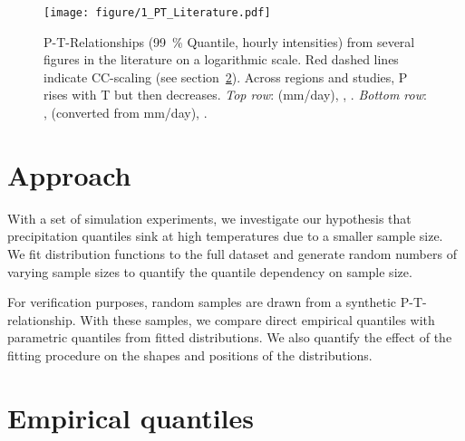 \documentclass[a4paper]{article}
\begin{document}
\begin{figure}[H] %
\texttt{[image: figure/1\_PT\_Literature.pdf]}
\caption[P-T-relationships in literature]{P-T-Relationships (99~\% Quantile, hourly intensities) from several figures in the literature  on a logarithmic scale. Red dashed lines indicate CC-scaling (see section~\ref{sec:equant}). Across regions and studies, P rises with T but then decreases.
\textit{Top row}:  \citet{berg_seasonal_2009} (mm/day), \citet{berg_strong_2013}, \citet{berg_unexpected_2013}.
\textit{Bottom row}: \citet{hardwick_jones_observed_2010}, \citet{utsumi_does_2011} (converted from mm/day), \citet{westra_future_2014}.}
\label{fig:PT_lit}
\end{figure}


\pagebreak

\section{Approach} %
\begin{multicols}{2}
With a set of simulation experiments, we investigate our hypothesis that precipitation quantiles sink at high temperatures due to a smaller sample size.
We fit distribution functions to the full dataset and generate random numbers of varying sample sizes to quantify the quantile dependency on sample size.

For verification purposes, random samples are drawn from a synthetic P-T-relationship.
With these samples, we compare direct empirical quantiles with parametric quantiles from fitted distributions.
We also quantify the effect of the fitting procedure on the shapes and positions of the distributions.
\end{multicols}


\section{Empirical quantiles} %
\label{sec:equant}
\end{document}
